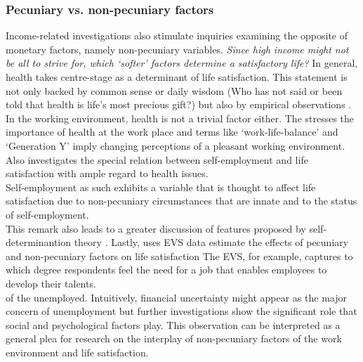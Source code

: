 \documentclass[preprint,12pt,authoryear]{elsarticle}
\begin{document}
\subsubsection{Pecuniary vs. non-pecuniary factors}
Income-related investigations also stimulate inquiries examining the opposite of monetary factors, namely non-pecuniary
variables. \textit{Since high income might not be all to strive for, which `softer' factors determine a satisfactory life?}
In general, health takes centre-stage as a determinant of life satisfaction. This statement is not only backed by common 
sense or daily wisdom (Who has not said or been told that health is life's most precious gift?) but also by empirical observations \citep{pedersen_happiness_2011}. \\
In the working environment, health is not a trivial factor either. The \citet{who_global_1994} stresses the importance of health at the work place and terms like `work-life-balance' and `Generation Y' imply changing perceptions of a pleasant working environment. Also \citet{andersson_happiness_2008}
investigates the special relation between self-employment and life satisfaction with ample regard to health issues. \\
Self-employment as such exhibits a variable that is thought to affect life satisfaction \citep{andersson_happiness_2008,schneck_why_2014,van_der_zwan_self-employment_2018}
due to non-pecuniary circumstances that are innate and to the status of self-employment. \\
This remark also leads to a greater discussion of features proposed by self-determinantion theory \citep{deci_intrinsic_1985,deci_self-determination_1989,ryan_self-determination_2000}.
Lastly, \citet{luo_essays_2018} uses EVS data estimate the effects of pecuniary and non-pecuniary factors on life satisfaction
The EVS, for example, captures to which degree respondents feel the need for a job that enables employees to develop their talents. \\
of the unemployed. Intuitively, financial uncertainty might appear as the major concern of unemployment but further investigations
show the significant role that social and psychological factors play. This observation can be interpreted as a general plea for research on
the interplay of non-pecuniary factors of the work environment and life satisfaction. 
\end{document}
